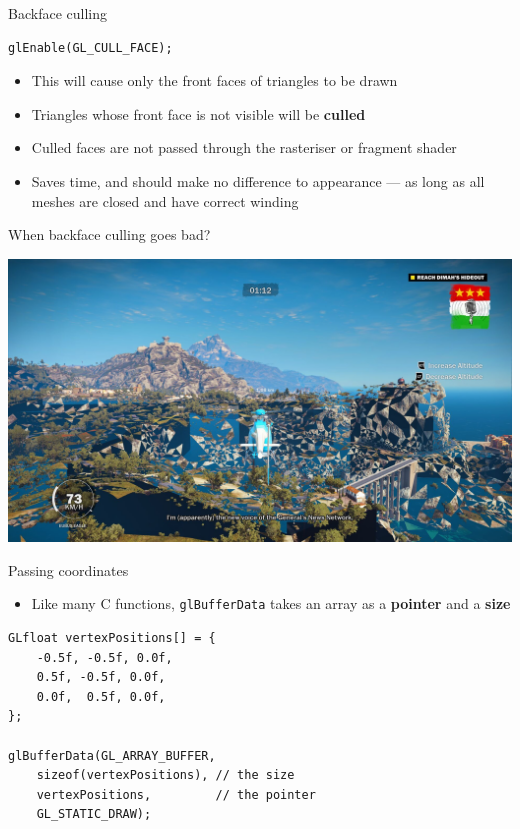 \begin{frame}[fragile]{Backface culling}
	\pause
	\begin{lstlisting}
glEnable(GL_CULL_FACE);
	\end{lstlisting}
	\begin{itemize}
		\pause\item This will cause only the front faces of triangles to be drawn
		\pause\item Triangles whose front face is not visible will be \textbf{culled}
		\pause\item Culled faces are not passed through the rasteriser or fragment shader
		\pause\item Saves time, and should make no difference to appearance ---
			as long as all meshes are closed and have correct winding
	\end{itemize}
\end{frame}

\begin{frame}[fragile]{When backface culling goes bad?}
	\begin{center}
		\includegraphics[width=\textwidth]{missing_triangles}
	\end{center}
\end{frame}

\begin{frame}[fragile]{Passing coordinates}
	\begin{itemize}
		\pause\item Like many C functions, \lstinline{glBufferData} takes an array as a \textbf{pointer} and a \textbf{size}
	\end{itemize}
	\pause\begin{lstlisting}
GLfloat vertexPositions[] = {
    -0.5f, -0.5f, 0.0f,
    0.5f, -0.5f, 0.0f,
    0.0f,  0.5f, 0.0f,
};

glBufferData(GL_ARRAY_BUFFER,
	sizeof(vertexPositions), // the size
	vertexPositions,         // the pointer
	GL_STATIC_DRAW);
	\end{lstlisting}
\end{frame}

